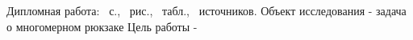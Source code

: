 ﻿
Дипломная работа: \pageref*{LastPage}~с., \totfig~рис., \tottab~табл., \totref~источников.
Объект исследования - задача о многомерном рюкзаке
Цель работы - 